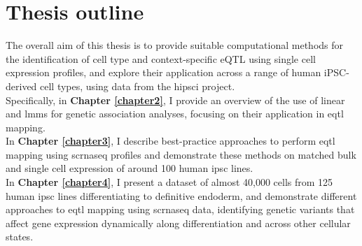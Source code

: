 \newpage

\section{Thesis outline}




The overall aim of this thesis is to provide suitable computational methods for the identification of cell type and context-specific eQTL using single cell expression profiles, 
and explore their application across a range of human iPSC-derived cell types, using data from the \gls{hipsci} project.\\



Specifically, in \textbf{Chapter 
\ref{chapter2}}, I provide an overview of the use of linear and \glspl{lmm} for genetic association analyses, focusing on their application in \gls{eqtl} mapping.\\

In \textbf{Chapter 
\ref{chapter3}}, I describe best-practice approaches to perform \gls{eqtl} mapping using \gls{scrnaseq} profiles and demonstrate these methods on matched bulk and single cell expression of around 100 human \gls{ipsc} lines.  \\

In \textbf{Chapter 
\ref{chapter4}}, I present a dataset of almost 40,000 cells from 125 human \gls{ipsc} lines differentiating to definitive endoderm, and demonstrate different approaches to \gls{eqtl} mapping using \gls{scrnaseq} data, identifying genetic variants that affect gene expression dynamically along differentiation and across other cellular states. \\

